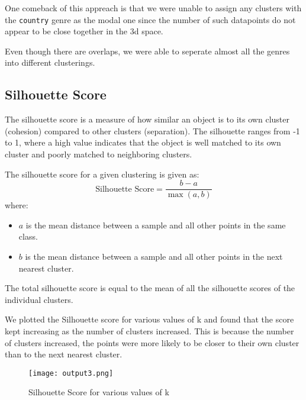 \documentclass{article}
\begin{document}
One comeback of this appreach is that we were unable to assign any clusters with the \texttt{country} genre as the modal one since the number of such datapoints do not appear to be close together in the 3d space.


Even though there are overlaps, we were able to seperate almost all the genres into different clusterings.
\subsection{Silhouette Score}
The silhouette score is a measure of how similar an object is to its own cluster (cohesion) compared to other clusters (separation). The silhouette ranges from -1 to 1, where a high value indicates that the object is well matched to its own cluster and poorly matched to neighboring clusters.

The silhouette score for a given clustering is given as:
\begin{equation}
    \text{Silhouette Score} = \frac{b - a}{\max(a, b)}
\end{equation}
where:
\begin{itemize}
    \item $a$ is the mean distance between a sample and all other points in the same class.
    \item $b$ is the mean distance between a sample and all other points in the next nearest cluster.
\end{itemize}
\cite{shilouette_gfg}

The total silhouette score is equal to the mean of all the silhouette scores of the individual clusters.

We plotted the Silhouette score for various values of k and found that the score kept increasing as the number of clusters increased. This is because the number of clusters increased, the points were more likely to be closer to their own cluster than to the next nearest cluster.

\begin{figure}[h]
\centering
\texttt{[image: output3.png]}
\caption{Silhouette Score for various values of k}
\label{fig:silhouette_score}
\end{figure}
\end{document}
